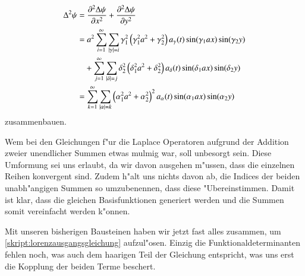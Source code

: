 \begin{align*}
\laplace^2\psi
&= 
\frac{\partial^2\laplace\psi}{\partial x^2} + 
\frac{\partial^2\laplace\psi}{\partial y^2}
\\
&=
a^2
\sum_{i = 1}^{\infty}
\sum_{|\gamma| = i}
\gamma_1^2
\left(\gamma_1^2 a^2+\gamma_2^2\right)
a_{\gamma}(t)
\sin(\gamma_1 ax) \sin(\gamma_2 y)
\\
&\phantom{={}}
+
\sum_{j = 1}^{\infty}
\sum_{|\delta| = j}
\delta_2^2
\left(\delta_1^2 a^2+\delta_2^2\right)
a_{\delta}(t)
\sin(\delta_1 ax) \sin(\delta_2 y)
\\
&=
\sum_{k = 1}^{\infty}
\sum_{|\alpha| = k}
\left(\alpha_1^2 a^2+\alpha_2^2\right)^2
a_{\alpha}(t)
\sin(\alpha_1 ax) \sin(\alpha_2 y)
\end{align*}
zusammenbauen.

Wem bei den Gleichungen f"ur die Laplace Operatoren aufgrund der Addition 
zweier unendlicher Summen etwas mulmig war, soll unbesorgt sein. Diese 
Umformung sei uns erlaubt, da wir davon ausgehen m"ussen, dass die einzelnen 
Reihen konvergent sind. Zudem h"alt uns nichts davon ab, die 
Indices der beiden unabh"angigen Summen so umzubenennen, dass diese 
"Ubereinstimmen. Damit ist klar, dass die gleichen Basisfunktionen generiert 
werden und die Summen somit vereinfacht werden k"onnen.

Mit unseren bisherigen Bausteinen haben wir jetzt fast alles zusammen, um 
\cref{skript:lorenzausgangsgleichung} aufzul"osen. Einzig die 
Funktionaldeterminanten fehlen noch, was auch dem haarigen Teil der Gleichung 
entspricht, was uns erst die Kopplung der beiden Terme beschert.

